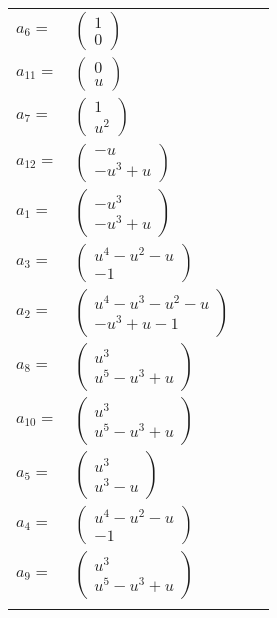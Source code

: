 \documentclass[1p]{elsarticle_modified}
\theoremstyle{definition}
\begin{document}
\begin{tabular}{m{7pt} m{180pt} m{7pt} m{180pt} }
\flushright $a_{6}=$&$\begin{pmatrix}1\\0\end{pmatrix}$ \\
\flushright $a_{11}=$&$\begin{pmatrix}0\\u\end{pmatrix}$ \\
\flushright $a_{7}=$&$\begin{pmatrix}1\\u^2\end{pmatrix}$ \\
\flushright $a_{12}=$&$\begin{pmatrix}- u\\- u^3+u\end{pmatrix}$ \\
\flushright $a_{1}=$&$\begin{pmatrix}- u^3\\- u^3+u\end{pmatrix}$ \\
\flushright $a_{3}=$&$\begin{pmatrix}u^4- u^2- u\\-1\end{pmatrix}$ \\
\flushright $a_{2}=$&$\begin{pmatrix}u^4- u^3- u^2- u\\- u^3+u-1\end{pmatrix}$ \\
\flushright $a_{8}=$&$\begin{pmatrix}u^3\\u^5- u^3+u\end{pmatrix}$ \\
\flushright $a_{10}=$&$\begin{pmatrix}u^3\\u^5- u^3+u\end{pmatrix}$ \\
\flushright $a_{5}=$&$\begin{pmatrix}u^3\\u^3- u\end{pmatrix}$ \\
\flushright $a_{4}=$&$\begin{pmatrix}u^4- u^2- u\\-1\end{pmatrix}$ \\
\flushright $a_{9}=$&$\begin{pmatrix}u^3\\u^5- u^3+u\end{pmatrix}$\\&\end{tabular}
\end{document}

